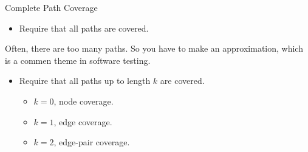 \documentclass[handout]{beamer}
\newcommand{\recordingpause}{
\begin{frame}{Recording Pause}
  \begin{center}
    Recording Pause
  \end{center}
\end{frame}
}
\renewcommand{\recordingpause}{}
\begin{document}
\recordingpause

\begin{frame}{Complete Path Coverage}
  \begin{itemize}
  \item Require that all paths are covered.
  \end{itemize}
  Often, there are too many paths. So you have to make an
  approximation, which is a commen theme in software testing.
  \begin{itemize}
  \item Require that all paths up to length $k$ are covered.
    \begin{itemize}
    \item $k=0$, node coverage.
    \item $k=1$, edge coverage.
    \item $k=2$, edge-pair coverage.
    \end{itemize}
  \end{itemize}
\end{frame}
\end{document}
